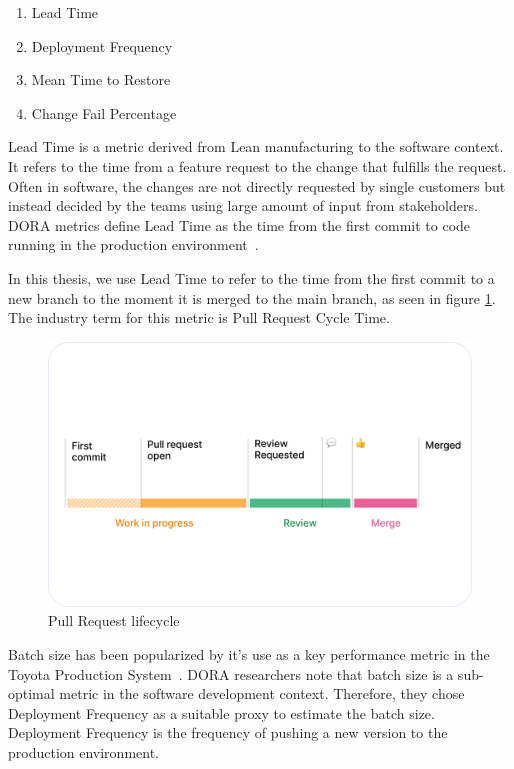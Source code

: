\begin{enumerate}
\item Lead Time
\item Deployment Frequency
\item Mean Time to Restore
\item Change Fail Percentage
\end{enumerate}

Lead Time is a metric derived from Lean manufacturing to the software context. It refers to the time from a feature request to the change that fulfills the request. Often in software, the changes are not directly requested by single customers but instead decided by the teams using large amount of input from stakeholders. DORA metrics define Lead Time as the time from the first commit to code running in the production environment~\cite{forsgren_accelerate_2018}.

In this thesis, we use Lead Time to refer to the time from the first commit to a new branch to the moment it is merged to the main branch, as seen in figure \ref{fig:CycleTime}. The industry term for this metric is Pull Request Cycle Time. 

\begin{figure}[ht]
    \begin{center}
        \includegraphics[width=13.5cm]{images/cycletime-defined}
        \caption{Pull Request lifecycle~\cite{swarmia_reducing_2022}}
        \label{fig:CycleTime}
    \end{center}
\end{figure}

Batch size has been popularized by it's use as a key performance metric in the Toyota Production System~\cite{ono_toyota_1988}. DORA researchers note that batch size is a sub-optimal metric in the software development context. Therefore, they chose Deployment Frequency as a suitable proxy to estimate the batch size. Deployment Frequency is the frequency of pushing a new version to the production environment.  

